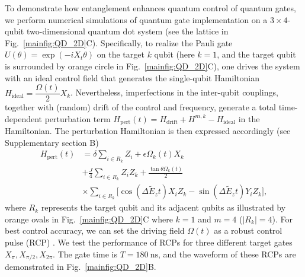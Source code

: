 \documentclass[12pt]{article}
\begin{document}
To demonstrate how entanglement enhances quantum control of quantum gates, we perform numerical simulations of quantum gate implementation on a $3\times4$-qubit two-dimensional quantum dot system (see the lattice in Fig.~\ref{mainfig:QD_2D}C). Specifically, to realize the Pauli gate $U(\theta)=\exp(-iX_t\theta)$ on the target $k$ qubit (here $k=1$, and the target qubit is surrounded by orange circle in Fig.~\ref{mainfig:QD_2D}C), one drives the system with an ideal control field that generates the single-qubit Hamiltonian $H_{\text{ideal}}=\dfrac{\Omega(t)}2X_k$. Nevertheless, imperfections in the inter-qubit couplings, together with (random) drift of the control and frequency, generate a total time-dependent perturbation term $H_{\text{pert}}(t)=H_{\text{drift}}+H^{m,k}-H_{\text{ideal}}$ in the Hamiltonian. 
The perturbation Hamiltonian is then expressed accordingly 
 (see Supplementary section B)
\begin{equation}
    \begin{aligned}
        H_{\text{pert}}(t) &= \delta \sum_{i\in R_k}Z_i + \epsilon\Omega_k(t)X_k \\&+ \frac{J}{4} \sum_{i\in R_k}Z_iZ_k
         + \frac{\tan\theta \Omega_k(t)}{2} \\ 
         & \times\sum_{i\in R_k}
         \Big[\cos(\Delta \tilde{E}_z t) X_iZ_k - \sin(\Delta \tilde{E}_z t) Y_iZ_k \Big],
    \end{aligned}
    \label{main_Eq_multi_noise}
\end{equation}
where $R_k$ represents the target qubit and its adjacent qubits as illustrated by orange ovals in Fig.~\ref{mainfig:QD_2D}C where $k=1$ and $m=4$ ($|R_k|=4$).  
For best control accuracy, we can set the driving field $\Omega(t)$ as a robust control pulse (RCP) \cite{hai2025scalablerobustquantumcontrol}.
We test the performance of RCPs for three different target gates $X_{\pi},X_{\pi/2},X_{2\pi}$. The gate time is $T=180~\mathrm{ns}$, and the waveform of these RCPs are demonstrated in Fig.~\ref{mainfig:QD_2D}B.
\end{document}
